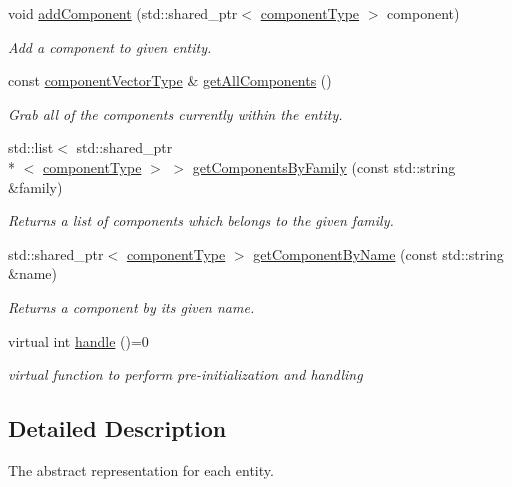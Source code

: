 \begin{DoxyCompactItemize}
void \hyperlink{class_abstract_entity_acef3c1e3a5a73723c447e535d9d76018}{add\-Component} (std\-::shared\-\_\-ptr$<$ \hyperlink{_abstract_component_8h_a2fb71c745bae7eefb130b6bd26fec141}{component\-Type} $>$ component)
\begin{DoxyCompactList}\small\item\em Add a component to given entity. \end{DoxyCompactList}\item 
const \hyperlink{_abstract_entity_8h_a42dce007a564572819cf6fe1d244b0e0}{component\-Vector\-Type} \& \hyperlink{class_abstract_entity_af67659713b7d451168d53206c1d71de7}{get\-All\-Components} ()
\begin{DoxyCompactList}\small\item\em Grab all of the components currently within the entity. \end{DoxyCompactList}\item 
std\-::list$<$ std\-::shared\-\_\-ptr\\*
$<$ \hyperlink{_abstract_component_8h_a2fb71c745bae7eefb130b6bd26fec141}{component\-Type} $>$ $>$ \hyperlink{class_abstract_entity_abbc553b403971e3208cd95520a78d6cf}{get\-Components\-By\-Family} (const std\-::string \&family)
\begin{DoxyCompactList}\small\item\em Returns a list of components which belongs to the given family. \end{DoxyCompactList}\item 
std\-::shared\-\_\-ptr$<$ \hyperlink{_abstract_component_8h_a2fb71c745bae7eefb130b6bd26fec141}{component\-Type} $>$ \hyperlink{class_abstract_entity_ab8ac5bf8465fb3586afe442718a63394}{get\-Component\-By\-Name} (const std\-::string \&name)
\begin{DoxyCompactList}\small\item\em Returns a component by its given name. \end{DoxyCompactList}\item 
virtual int \hyperlink{class_abstract_entity_af14b173190f84093b5498d3c0139e71f}{handle} ()=0
\begin{DoxyCompactList}\small\item\em virtual function to perform pre-\/initialization and handling \end{DoxyCompactList}\end{DoxyCompactItemize}


\subsection{Detailed Description}
The abstract representation for each entity. 

